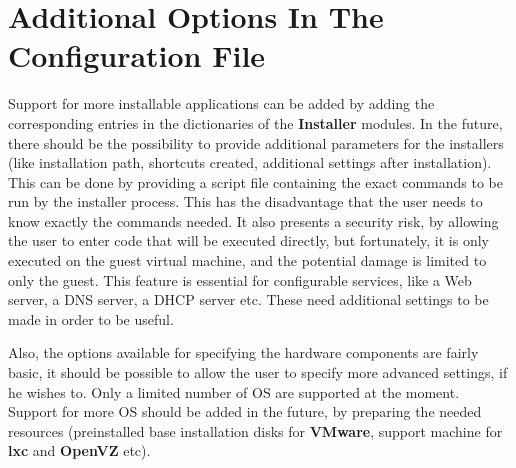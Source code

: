 \section{Additional Options In The Configuration File}
\label{sec:more-opts}
Support for more installable applications can be added by adding the
corresponding entries in the dictionaries of the \textbf{Installer} modules. In
the future, there should be the possibility to provide additional parameters
for the installers (like installation path, shortcuts created, additional
settings after installation). This can be done by providing a script file
containing the exact commands to be run by the installer process. This has the
disadvantage that the user needs to know exactly the commands needed. It also
presents a security risk, by allowing the user to enter code that will be
executed directly, but fortunately, it is only executed on the guest virtual
machine, and the potential damage is limited to only the guest. This feature is
essential for configurable services, like a Web server, a DNS server, a DHCP
server etc. These need additional settings to be made in order to be useful.

Also, the options available for specifying the hardware components are fairly
basic, it should be possible to allow the user to specify more advanced
settings, if he wishes to. Only a limited number of OS are supported at the
moment. Support for more OS should be added in the future, by preparing the
needed resources (preinstalled base installation disks for \textbf{VMware},
support machine for \textbf{lxc} and \textbf{OpenVZ} etc).
